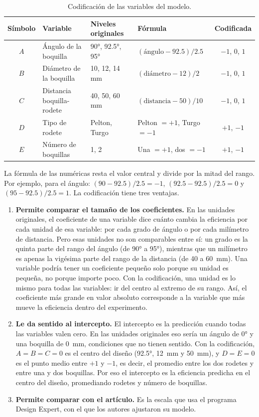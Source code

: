 \begin{table}[ht]
\centering
\caption{Codificación de las variables del modelo.}
\label{tab:codificacion}
\small
\begin{tabular}{clllc}
\toprule
Símbolo & Variable & Niveles originales & Fórmula & Codificada \\
\midrule
$A$ & Ángulo de la boquilla     & 90°, 92.5°, 95°    & $(\text{ángulo} - 92.5)/2.5$    & $-1$, $0$, $1$ \\
$B$ & Diámetro de la boquilla   & 10, 12, 14 mm      & $(\text{diámetro} - 12)/2$      & $-1$, $0$, $1$ \\
$C$ & Distancia boquilla-rodete & 40, 50, 60 mm      & $(\text{distancia} - 50)/10$    & $-1$, $0$, $1$ \\
$D$ & Tipo de rodete            & Pelton, Turgo      & Pelton $= +1$, Turgo $= -1$     & $+1$, $-1$ \\
$E$ & Número de boquillas       & 1, 2               & Una $= +1$, dos $= -1$          & $+1$, $-1$ \\
\bottomrule
\end{tabular}
\end{table}

La fórmula de las numéricas resta el valor central y divide por la mitad del rango. Por ejemplo, para el ángulo: $(90 - 92.5)/2.5 = -1$, $(92.5 - 92.5)/2.5 = 0$ y $(95 - 92.5)/2.5 = 1$. La codificación tiene tres ventajas.

\begin{enumerate}
  \item \textbf{Permite comparar el tamaño de los coeficientes.} En las unidades originales, el coeficiente de una variable dice cuánto cambia la eficiencia por cada unidad de esa variable: por cada grado de ángulo o por cada milímetro de distancia. Pero esas unidades no son comparables entre sí: un grado es la quinta parte del rango del ángulo (de 90° a 95°), mientras que un milímetro es apenas la vigésima parte del rango de la distancia (de 40 a 60~mm). Una variable podría tener un coeficiente pequeño solo porque su unidad es pequeña, no porque importe poco. Con la codificación, una unidad es lo mismo para todas las variables: ir del centro al extremo de su rango. Así, el coeficiente más grande en valor absoluto corresponde a la variable que más mueve la eficiencia dentro del experimento.
  \item \textbf{Le da sentido al intercepto.} El intercepto es la predicción cuando todas las variables valen cero. En las unidades originales eso sería un ángulo de 0° y una boquilla de 0~mm, condiciones que no tienen sentido. Con la codificación, $A = B = C = 0$ es el centro del diseño (92.5°, 12~mm y 50~mm), y $D = E = 0$ es el punto medio entre $+1$ y $-1$, es decir, el promedio entre los dos rodetes y entre una y dos boquillas. Por eso el intercepto es la eficiencia predicha en el centro del diseño, promediando rodetes y número de boquillas.
  \item \textbf{Permite comparar con el artículo.} Es la escala que usa el programa Design Expert, con el que los autores ajustaron su modelo.
\end{enumerate}

